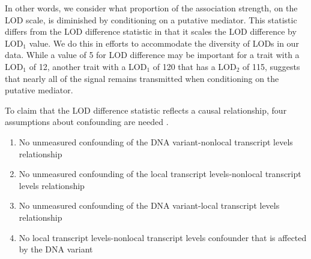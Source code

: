 \documentclass{book}
\newenvironment{frameenv}[1]
    {\begin{myfloat}[tb]
    \begin{mdframed}[roundcorner=10pt,backgroundcolor=blue!10]
    \caption{#1}
    }
    {%
    \end{mdframed}\end{myfloat}
    }
\begin{document}
In other words, we consider what proportion of the association strength, on the LOD scale, is diminished by conditioning on a putative mediator. This statistic differs from the LOD difference statistic in that it scales the LOD difference by LOD$_1$ value. We do this in efforts to accommodate the diversity of LODs in our data. While a value of 5 for LOD difference may be important for a trait with a LOD$_1$ of 12, another trait with a LOD$_1$ of 120 that has a LOD$_2$ of 115, suggests that nearly all of the signal remains transmitted when conditioning on the putative mediator.








To claim that the LOD difference statistic reflects a causal relationship, four assumptions about confounding are needed \citep{vanderweele2015explanation}.



\begin{frameenv}{Four assumptions for causal inference}\label{frame1}
  \begin{enumerate}
\item No unmeasured confounding of the DNA variant-nonlocal transcript levels relationship
\item No unmeasured confounding of the local transcript levels-nonlocal transcript levels relationship
\item No unmeasured confounding of the DNA variant-local transcript levels relationship
\item No local transcript levels-nonlocal transcript levels confounder that is affected by the DNA variant
\end{enumerate}

\end{frameenv}
\end{document}
